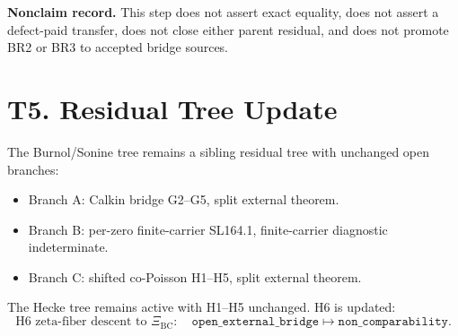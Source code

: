 \documentclass[11pt]{article}
\newcommand{\XiBC}{\Xi_{\mathrm{BC}}}
\begin{document}
\textbf{Nonclaim record.}
This step does not assert exact equality, does not assert a defect-paid
transfer, does not close either parent residual, and does not promote BR2 or
BR3 to accepted bridge sources.

\section{T5. Residual Tree Update}

The Burnol/Sonine tree remains a sibling residual tree with unchanged open
branches:
\begin{itemize}[leftmargin=2em]
\item Branch A: Calkin bridge G2--G5, split external theorem.
\item Branch B: per-zero finite-carrier SL164.1, finite-carrier diagnostic
indeterminate.
\item Branch C: shifted co-Poisson H1--H5, split external theorem.
\end{itemize}

The Hecke tree remains active with H1--H5 unchanged. H6 is updated:
\[
  \text{H6 zeta-fiber descent to }\XiBC:
  \quad \texttt{open\_external\_bridge}
  \longmapsto
  \texttt{non\_comparability}.
\]
\end{document}
